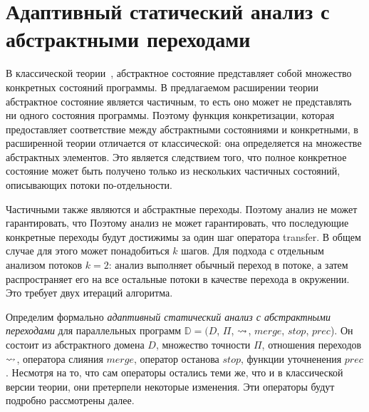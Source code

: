 

\section{Адаптивный статический анализ с абстрактными переходами}
\label{sect_cpata}

\newcommand{\update}{update}
\newcommand{\frontier}{frontier}

В классической теории~\cite{BeyerCPA07,Beyer08}, абстрактное состояние представляет собой множество конкретных состояний программы.
В предлагаемом расширении теории абстрактное состояние является частичным, то есть оно может не представлять ни одного состояния программы.
Поэтому функция конкретизации, которая предоставляет соответствие между абстрактными состояниями и конкретными, в расширенной теории отличается от классической: она определяется на множестве абстрактных элементов.
Это является следствием того, что полное конкретное состояние может быть получено только из нескольких частичных состояний, описывающих потоки по-отдельности.

Частичными также являются и абстрактные переходы.
Поэтому анализ не может гарантировать, что 
Поэтому анализ не может гарантировать, что последующие конкретные переходы будут достижимы за один шаг оператора transfer.
В общем случае для этого может понадобиться $k$ шагов. Для подхода с отдельным анализом потоков $k=2$: анализ выполняет обычный переход в потоке, а затем распространяет его на все остальные потоки в качестве перехода в окружении. Это требует двух итераций алгоритма.

Определим формально \emph{адаптивный статический анализ с абстрактными переходами} для параллельных программ $\mathbb{D}=(D$, $\Pi$, $\leadsto$, $merge$, $stop$, $prec$).
Он состоит из абстрактного домена $D$, 
множество точности $\Pi$, 
отношения переходов $\leadsto$,
оператора слияния $merge$, оператор останова $stop$, функции уточненения $prec$.
Несмотря на то, что сам операторы остались теми же, что и в классической версии теории, они претерпели некоторые изменения.
Эти операторы будут подробно рассмотрены далее.

